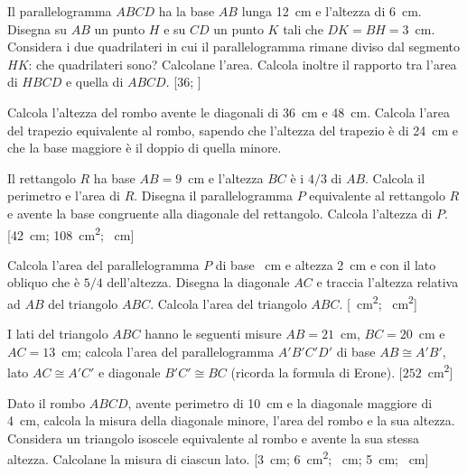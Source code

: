 \begin{multicols}{2}
\begin{esercizio}
\label{ese:7.47}
Il parallelogramma $ABCD$ ha la base $AB$ lunga 12~cm e l'altezza di 6~cm. Disegna su $AB$ un punto $H$ e su $CD$ un punto $K$ tali che $DK=BH=3$~cm. Considera i due quadrilateri in cui il parallelogramma rimane diviso dal segmento $HK$: che quadrilateri sono? Calcolane l'area. Calcola inoltre il rapporto tra l'area di $HBCD$ e quella di $ABCD$.
[36; ]
\end{esercizio}

\begin{esercizio}
\label{ese:7.48}
Calcola l'altezza del rombo avente le diagonali di 36~cm e 48~cm. Calcola l'area del trapezio equivalente al rombo, sapendo che l'altezza del trapezio è di 24~cm e che la base maggiore è il doppio di quella minore.
\end{esercizio}

\begin{esercizio}
\label{ese:7.49}
Il rettangolo $R$ ha base $AB = 9$~cm e l'altezza $BC$ è i $4/3$ di $AB$. Calcola il perimetro e l'area di $R$. Disegna il parallelogramma $P$ equivalente al rettangolo $R$ e avente la base congruente alla diagonale del rettangolo. Calcola l'altezza di $P$. 
[42~cm; 108~cm\textsuperscript{2}; ~cm]
\end{esercizio}

\begin{esercizio}
\label{ese:7.50}
Calcola l'area del parallelogramma $P$ di base ~cm e altezza 2~cm e con il lato obliquo che è $5/4$ dell'altezza. Disegna la diagonale $AC$ e traccia l'altezza relativa ad $AB$ del triangolo $ABC$. Calcola l'area del triangolo $ABC$.
[~cm\textsuperscript{2}; ~cm\textsuperscript{2}]
\end{esercizio}

\begin{esercizio}
\label{ese:7.51}
I lati del triangolo $ABC$ hanno le seguenti misure $AB=21$~cm, $BC=20$~cm e $AC=13$~cm; calcola l'area del parallelogramma $A'B'C'D'$ di base $AB\cong A'B'$, lato $AC\cong A'C'$ e diagonale $B'C'\cong BC$ (ricorda la formula di Erone).
[$252$~cm\textsuperscript{2}]
\end{esercizio}

\begin{esercizio}
\label{ese:7.52}
Dato il rombo $ABCD$, avente perimetro di 10~cm e la diagonale maggiore di 4~cm, calcola la misura della diagonale minore, l'area del rombo e la sua altezza. Considera un triangolo isoscele equivalente al rombo e avente la sua stessa altezza. Calcolane la misura di ciascun lato.
[3~cm; 6~cm\textsuperscript{2}; ~cm; 5~cm; ~cm]
\end{esercizio}


\end{multicols}
